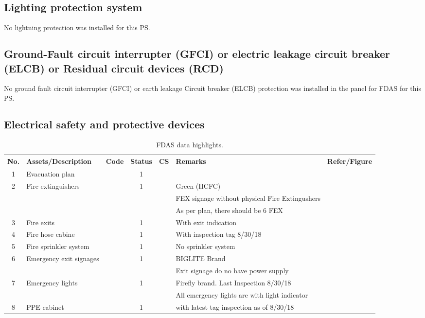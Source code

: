 \subsection{Lighting protection system} \label{ch04fdas02}
No lightning protection was installed for this PS.
\subsection{Ground-Fault circuit interrupter (GFCI) or electric leakage circuit breaker (ELCB) or Residual circuit devices (RCD)} \label{ch04fdas03}
No ground fault circuit interrupter (GFCI) or earth leakage Circuit breaker (ELCB) protection was installed in the panel for FDAS for this PS.
\subsection{Electrical safety and protective devices} \label{ch04fdas04}

\begin{table}[!h]
	\caption{FDAS data highlights.}
	\label{ch04_fdas01}
	{\footnotesize
		\begin{tabular}{c|p{5cm}|c|c|c|p{4cm}|p{1cm}}
\hline
No. & Assets/Description & Code & Status & CS & Remarks & Refer/Figure \\ 
\hline
1 & Evacuation plan &  & 1 &  &  &  \\ 
2 & Fire extinguishers &  & 1 &  & Green (HCFC)  &  \\ 
&  &  &  &  & FEX signage without physical Fire Extingushers  &  \\ 
&  &  &  &  & As per plan, there should be 6 FEX &  \\ 
3 & Fire exits &  & 1 &  & With exit indication &  \\ 
4 & Fire hose cabine &  & 1 &  & With inspection tag 8/30/18 &  \\ 
5 & Fire sprinkler system &  & 1 &  & No sprinkler system &  \\ 
6 & Emergency exit signages &  & 1 &  & BIGLITE Brand &  \\ 
&  &  &  &  & Exit signage do no have power supply &  \\ 
7 & Emergency lights &  & 1 &  & Firefly brand. Last Inspection 8/30/18 &  \\ 
&  &  &  &  & All emergency lights are with light indicator &  \\ 
8 & PPE cabinet &  & 1 &  & with latest tag inspection as of 8/30/18 &  \\ 
\hline
\end{tabular}	
	}
\end{table}

